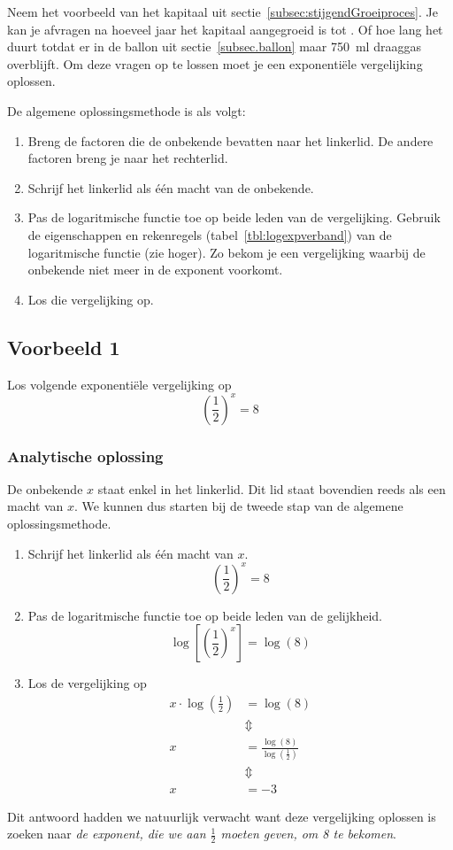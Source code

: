 Neem het voorbeeld van het kapitaal uit sectie~\ref{subsec:stijgendGroeiproces}. Je kan je afvragen na hoeveel jaar het kapitaal aangegroeid is tot . Of   hoe lang het duurt totdat er in de ballon uit sectie~\ref{subsec.ballon} maar \SI{750}{\ml} draaggas overblijft. Om deze vragen op te lossen moet je een exponentiële vergelijking oplossen.

De algemene oplossingsmethode is als volgt:
\begin{enumerate}
\item Breng de factoren die de onbekende bevatten naar het linkerlid. De andere factoren breng je naar het rechterlid.
\item Schrijf het linkerlid als \'e\'en macht van de onbekende.
    \item  Pas de logaritmische functie toe op beide leden van de vergelijking. Gebruik 
    de eigenschappen en rekenregels (tabel~\ref{tbl:logexpverband}) van de logaritmische functie (zie hoger). 
    Zo bekom je een vergelijking waarbij de onbekende niet meer in de exponent voorkomt.
    \item Los die vergelijking op.
\end{enumerate}

\subsection{Voorbeeld 1}
Los volgende exponenti\"{e}le vergelijking op 
\begin{equation}
\left( \frac{1}{2}\right)^{x}=8
\label{exp_vgl:een}
\end{equation}


 \subsubsection{Analytische oplossing}
 De onbekende $x$ staat enkel in het linkerlid. Dit lid staat bovendien reeds als een macht van $x$. 
We kunnen dus starten bij de tweede stap van de algemene oplossingsmethode.
\begin{enumerate}
\addtocounter{enumi}{1}
\item Schrijf het linkerlid als \'e\'en macht van $x$.
\[
\left(\frac{1}{2}\right)^{x} =  8 
\]
\item Pas de logaritmische functie toe op beide leden van de gelijkheid.
\[
\log\left[ \left(\frac{1}{2}\right)^{x}\right] =  \log(8)
\]
\item Los de vergelijking op
\begin{align*}
     x\cdot \log\left(\frac{1}{2}\right) &=  \log(8)  \\
      &\Updownarrow  \\
     x &=  \frac{\log(8)}{\log\left(\frac{1}{2}\right)}  \\
      &\Updownarrow  \\
     x &= -3
 \end{align*}
\end{enumerate}
 Dit antwoord hadden we natuurlijk verwacht want deze vergelijking
 oplossen is zoeken naar \emph{de exponent, die we aan $\frac{1}{2}$
 moeten geven, om 8 te bekomen}.

